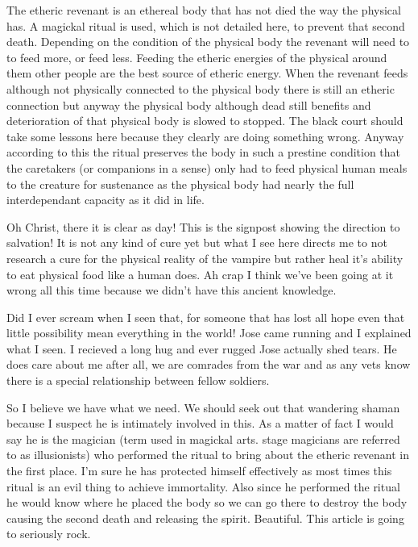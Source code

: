 The etheric revenant is an ethereal body that has not died the way the physical has. A magickal ritual is used, which is not detailed here, to prevent that second death. Depending on the condition of the physical body the revenant will need to to feed more, or feed less. Feeding the etheric energies of the physical around them other people are the best source of etheric energy. When the revenant feeds although not physically connected to the physical body there is still an etheric connection but anyway the physical body although dead still benefits and deterioration of that physical body is slowed to stopped. The black court should take some lessons here because they clearly are doing something wrong. Anyway according to this the ritual preserves the body in such a prestine condition that the caretakers (or companions in a sense) only had to feed physical human meals to the creature for sustenance as the physical body had nearly the full interdependant capacity as it did in life.

Oh Christ, there it is clear as day! This is the signpost showing the direction to salvation! It is not any kind of cure yet but what I see here directs me to not research a cure for the physical reality of the vampire but rather heal it's ability to eat physical food like a human does. Ah crap I think we've been going at it wrong all this time because we didn't have this ancient knowledge. 

Did I ever scream when I seen that, for someone that has lost all hope even that little possibility mean everything in the world! Jose came running and I explained what I seen. I recieved a long hug and ever rugged Jose actually shed tears. He does care about me after all, we are comrades from the war and as any vets know there is a special relationship between fellow soldiers.

So I believe we have what we need. We should seek out that wandering shaman because I suspect he is intimately involved in this. As a matter of fact I would say he is the magician (term used in magickal arts. stage magicians are referred to as illusionists) who performed the ritual to bring about the etheric revenant in the first place. I'm sure he has protected himself effectively as most times this ritual is an evil thing to achieve immortality. Also since he performed the ritual he would know where he placed the body so we can go there to destroy the body causing the second death and releasing the spirit. Beautiful. This article is going to seriously rock.


